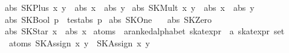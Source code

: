 \begin{isabellebody}
{}\ {}abs\ {}SKPlus\ x\ y{}\ {}\ abs\ x\ {}\ abs\ y{}\isanewline
{}\ {}abs\ {}SKMult\ x\ y{}\ {}\ abs\ x\ {}\ abs\ y{}\isanewline
{}\ {}abs\ {}SKBool\ p{}\ {}\ test{}abs\ p{}\isanewline
{}\ {}abs\ SKOne\ {}\ {}{}\isanewline
{}\ {}abs\ SKZero\ {}\ {}{}\isanewline
{}\ {}abs\ {}SKStar\ x{}\ {}\ {}abs\ x{}\isanewline
\isanewline
{}\isamarkupfalse%
\ atoms\ {}{}\ {}{}a{}{}ranked{}alphabet\ skat{}expr\ {}\ {}a\ skat{}expr\ set{}\ \isanewline
\ \ {}atoms\ {}SKAssign\ x\ y{}\ {}\ {}SKAssign\ x\ y{}{}\isanewline

\end{isabellebody}
